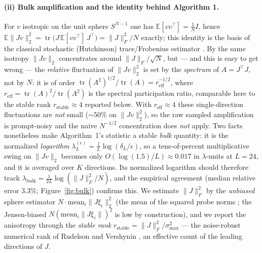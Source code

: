\documentclass{article}
\begin{document}
\paragraph{(ii) Bulk amplification and the identity behind Algorithm 1.}
For $v$ isotropic on the unit sphere $S^{N-1}$ one has $\mathbb E[vv^\top]=\tfrac1N I$, hence
$\mathbb E\|Jv\|_2^2=\operatorname{tr}\!\big(J\,\mathbb E[vv^\top]\,J^\top\big)=\|J\|_F^2/N$
exactly; this identity is the basis of the classical stochastic (Hutchinson) trace/Frobenius
estimator \cite{hutchinson1990stochastic}. By the same isotropy $\|Jv\|_2$ concentrates around
$\|J\|_F/\sqrt N$, but --- and this is easy to get wrong --- the \emph{relative} fluctuation of
$\|Jv\|_2^2$ is set by the \emph{spectrum} of $A=J^\top J$, not by $N$: it is of order
$\operatorname{tr}(A^2)^{1/2}/\operatorname{tr}(A)=r_{\mathrm{eff}}^{-1/2}$, where
$r_{\mathrm{eff}}=\operatorname{tr}(A)^2/\operatorname{tr}(A^2)$ is the spectral participation ratio,
comparable here to the stable rank $r_{\mathrm{stable}}\approx4$ reported below. With
$r_{\mathrm{eff}}\approx4$ these single-direction fluctuations are \emph{not} small
($\sim\!50\%$ on $\|Jv\|_2^2$), so the raw sampled amplification is prompt-noisy and the naive
$N^{-1/2}$ concentration does \emph{not} apply. Two facts nonetheless make Algorithm~1's statistic a stable
\emph{bulk} quantity: it is the normalized \emph{logarithm}
$\lambda_L^{(\epsilon)}=\tfrac1L\log(\delta_L/\epsilon)$, so a tens-of-percent multiplicative swing
on $\|Jv\|_2$ becomes only $O(\log(1.5)/L)\approx0.017$ in $\lambda$-units at $L=24$, and it is
averaged over $K$ directions. Its normalized logarithm should therefore track
$\lambda_{\mathrm{bulk}}=\tfrac{1}{2L}\log(\|J\|_F^2/N)$, and the empirical agreement (median relative
error $3.3\%$; Figure~\ref{fig:bulk}) confirms this. We estimate $\|J\|_F^2$ by the
\emph{unbiased} sphere estimator $N\cdot\mathrm{mean}_i\|J\xi_i\|_2^2$ (the mean of the squared
probe norms \cite{hutchinson1990stochastic}; the Jensen-biased $N(\mathrm{mean}_i\|J\xi_i\|)^2$ is
low by construction), and we report the anisotropy through the \emph{stable rank}
$r_{\mathrm{stable}}=\|J\|_F^2/\sigma_{\max}^2$ --- the noise-robust numerical rank of Rudelson and
Vershynin \cite{rudelson2007sampling}, an effective count of the leading directions of $J$.
\end{document}
